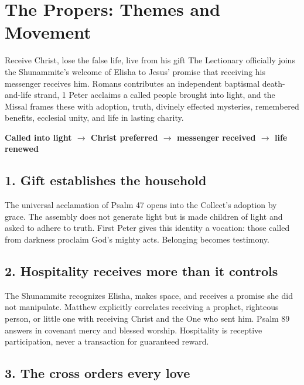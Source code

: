 \section*{The Propers: Themes and Movement}

\begin{massbox}{Receive Christ, lose the false life, live from his gift}
The Lectionary officially joins the Shunammite's welcome of Elisha to Jesus' promise that receiving his messenger receives him. Romans contributes an independent baptismal death-and-life strand, 1 Peter acclaims a called people brought into light, and the Missal frames these with adoption, truth, divinely effected mysteries, remembered benefits, ecclesial unity, and life in lasting charity.
\end{massbox}

\begin{center}
\textbf{Called into light $\longrightarrow$ Christ preferred $\longrightarrow$ messenger received $\longrightarrow$ life renewed}
\end{center}

\subsection*{1. Gift establishes the household\enspace{}}

The universal acclamation of Psalm 47 opens into the Collect's adoption by grace. The assembly does not generate light but is made children of light and asked to adhere to truth. First Peter gives this identity a vocation: those called from darkness proclaim God's mighty acts. Belonging becomes testimony.

\subsection*{2. Hospitality receives more than it controls\enspace{}}

The Shunammite recognizes Elisha, makes space, and receives a promise she did not manipulate. Matthew explicitly correlates receiving a prophet, righteous person, or little one with receiving Christ and the One who sent him. Psalm 89 answers in covenant mercy and blessed worship. Hospitality is receptive participation, never a transaction for guaranteed reward.

\subsection*{3. The cross orders every love\enspace{}}

